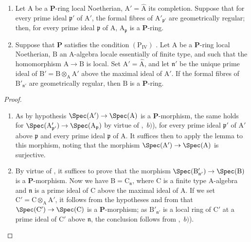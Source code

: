 \begin{corollary}[7.4.3]
\label{IV.7.4.3}
\begin{enumerate}[label=\emph{\roman*)}]
  \item Let $\mathrm{A}$ be a $\boldsymbol{P}$-ring local Noetherian, $\mathrm{A}'=\widehat{\mathrm{A}}$ its completion.
  Suppose that for every prime ideal $\mathfrak{p}'$ of $\mathrm{A}'$, the formal fibres of $\mathrm{A}'_{\mathfrak{p}'}$ are geometrically regular; then, for every prime ideal $\mathfrak{p}$ of $\mathrm{A}$, $\mathrm{A}_\mathfrak{p}$ is a $\boldsymbol{P}$-ring.

  \item Suppose that $\boldsymbol{P}$ satisfies the condition $(\mathrm{P_{IV}})$ .
  Let $\mathrm{A}$ be a $\boldsymbol{P}$-ring local Noetherian, $\mathrm{B}$ an A-algebra locale essentially of finite type, and such that the homomorphism $\mathrm{A}\to\mathrm{B}$ is local.
  Set $\mathrm{A}'=\widehat{\mathrm{A}}$, and let $\mathfrak{n}'$ be the unique prime ideal of $\mathrm{B}'=\mathrm{B}\otimes_\mathrm{A}\mathrm{A}'$ above the maximal ideal of $\mathrm{A}'$.
  If the formal fibres of $\mathrm{B}'_{\mathfrak{n}'}$ are geometrically regular, then $\mathrm{B}$ is a $\boldsymbol{P}$-ring.
\end{enumerate}
\end{corollary}

\begin{proof}
\begin{enumerate}[label=(\roman*)]
  \item As by hypothesis $\Spec(\mathrm{A}')\to\Spec(\mathrm{A})$ is a $\boldsymbol{P}$-morphism, the same holds for $\Spec(\mathrm{A}'_{\mathfrak{p}'})\to\Spec(\mathrm{A}_\mathfrak{p})$ by virtue of ,~$b)$), for every prime ideal $\mathfrak{p}'$ of $\mathrm{A}'$ above $\mathfrak{p}$ and every prime ideal $\mathfrak{p}$ of $\mathrm{A}$.
  It suffices then to apply the lemma  to this morphism, noting that the morphism $\Spec(\mathrm{A}')\to\Spec(\mathrm{A})$ is surjective.

  \item By virtue of , it suffices to prove that the morphism $\Spec(\mathrm{B}'_{\mathfrak{n}'})\to\Spec(\mathrm{B})$ is a $\boldsymbol{P}$-morphism.
  Now we have $\mathrm{B}=\mathrm{C}_\mathfrak{n}$, where $\mathrm{C}$ is a finite type A-algebra and $\mathfrak{n}$ is a prime ideal of $\mathrm{C}$ above the maximal ideal of $\mathrm{A}$.
  If we set $\mathrm{C}'=\mathrm{C}\otimes_\mathrm{A}\mathrm{A}'$, it follows from the hypotheses and from  that $\Spec(\mathrm{C}')\to\Spec(\mathrm{C})$ is a $\boldsymbol{P}$-morphism; as $\mathrm{B}'_{\mathfrak{n}'}$ is a local ring of $\mathrm{C}'$ at a prime ideal of $\mathrm{C}'$ above $\mathfrak{n}$, the conclusion follows from ,~$b)$).
\end{enumerate}
\end{proof}

